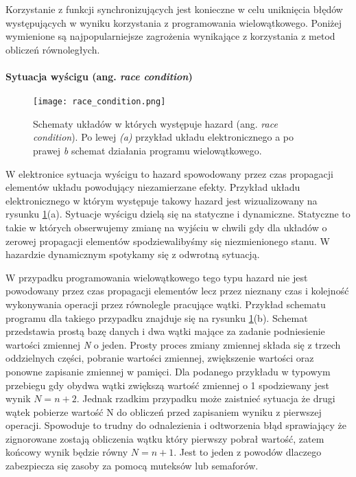 Korzystanie z funkcji synchronizujących jest konieczne w celu uniknięcia błędów występujących w wyniku korzystania z programowania wielowątkowego. Poniżej wymienione są najpopularniejsze zagrożenia  wynikające z korzystania z metod obliczeń równoległych. 

\paragraph{Sytuacja wyścigu (ang. \textit{race condition})}

\begin{figure}[t]
        \centering
        \texttt{[image: race\_condition.png]}
        \caption{Schematy układów w których występuje hazard (ang. \textit{race condition}). Po lewej \textit{(a)} przykład układu elektronicznego a po prawej \textit{{b}} schemat działania programu wielowątkowego. }
        \label{race condition}
\end{figure}

W elektronice sytuacja wyścigu to hazard spowodowany przez czas propagacji elementów układu powodujący niezamierzane efekty. Przykład układu elektronicznego w którym występuje takowy hazard jest wizualizowany na rysunku \ref{race condition}(a). 
Sytuacje wyścigu dzielą się na statyczne i dynamiczne. Statyczne to takie w których obserwujemy zmianę na wyjściu w chwili gdy dla układów o zerowej propagacji elementów spodziewalibyśmy się niezmienionego stanu.
W hazardzie dynamicznym spotykamy się z odwrotną sytuacją. 

W przypadku programowania wielowątkowego tego typu hazard nie jest powodowany przez czas propagacji elementów lecz przez nieznany czas i kolejność wykonywania operacji przez równolegle pracujące wątki. Przykład schematu programu dla takiego przypadku znajduje się na rysunku \ref{race condition}(b). Schemat przedstawia prostą bazę danych i dwa wątki mające za zadanie podniesienie wartości zmiennej \textit{N} o jeden.
Prosty proces zmiany zmiennej składa się z trzech oddzielnych części, pobranie wartości zmiennej, zwiększenie wartości oraz ponowne zapisanie zmiennej w pamięci. 
Dla podanego przykładu w typowym przebiegu gdy obydwa wątki zwiększą wartość zmiennej o 1 spodziewany jest wynik $N = n+2$. Jednak rzadkim przypadku może zaistnieć sytuacja że drugi wątek pobierze wartość N do obliczeń przed zapisaniem wyniku z pierwszej operacji. Spowoduje to trudny do odnalezienia i odtworzenia błąd sprawiający że zignorowane zostają obliczenia wątku który pierwszy pobrał wartość, zatem końcowy wynik będzie równy $N = n+1$.
Jest to jeden z powodów dlaczego zabezpiecza się zasoby za pomocą muteksów lub semaforów. 

